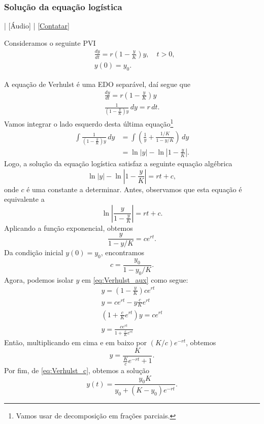 \subsubsection{Solução da equação logística}

\begin{flushright}
  [Vídeo] | [Áudio] | \href{https://phkonzen.github.io/notas/contato.html}{[Contatar]}
\end{flushright}

Consideramos o seguinte PVI
\begin{align}
  &\frac{dy}{dt} = r\left(1 - \frac{y}{K}\right)y,\quad t>0,\\
  &y(0) = y_0.
\end{align}

A equação de Verhulst é uma EDO separável, daí segue que
\begin{gather}
  \frac{dy}{dt} = r\left(1 - \frac{y}{K}\right)y \\
  \frac{1}{\left(1 - \frac{y}{K}\right)y}\,dy = r\,dt.
\end{gather}
Vamos integrar o lado esquerdo desta última equação\footnote{Vamos usar de decomposição em frações parciais.}
\begin{align}
  \int \frac{1}{\left(1 - \frac{y}{K}\right)y}\,dy &= \int \left(\frac{1}{y} + \frac{1/K}{1-y/K}\right)\,dy \\
  &= \ln|y| - \ln\left|1 - \frac{y}{K}\right|.
\end{align}
Logo, a solução da equação logística satisfaz a seguinte equação algébrica
\begin{equation}
  \ln|y| - \ln\left|1 - \frac{y}{K}\right| = rt + c,
\end{equation}
onde $c$ é uma constante a determinar. Antes, observamos que esta equação é equivalente a
\begin{equation}
  \ln\left|\frac{y}{1 - \frac{y}{K}}\right| = rt + c.
\end{equation}
Aplicando a função exponencial, obtemos
\begin{equation}\label{eq:Verhulst_aux}
  \frac{y}{1 - y/K} = ce^{rt}.
\end{equation}
Da condição inicial $y(0) = y_0$, encontramos
\begin{equation}\label{eq:Verhulst_c}
  c = \frac{y_0}{1 - y_0/K}.
\end{equation}
Agora, podemos isolar $y$ em \eqref{eq:Verhulst_aux} como segue: 
\begin{gather}
  y = \left(1-\frac{y}{K}\right)ce^{rt}\\
  y = ce^{rt} - y\frac{c}{K}e^{rt} \\
  \left(1 + \frac{c}{K}e^{rt}\right)y = ce^{rt}\\
  y = \frac{ce^{rt}}{1+\frac{c}{K}e^{rt}}
\end{gather}
Então, multiplicando em cima e em baixo por $(K/c)e^{-rt}$, obtemos
\begin{equation}
  y = \frac{K}{\frac{K}{c}e^{-rt} + 1}.
\end{equation}
Por fim, de \eqref{eq:Verhulst_c}, obtemos a solução
\begin{equation}\label{eq:sol_verhulst}
  y(t) = \frac{y_0K}{y_0 + (K-y_0)e^{-rt}}.
\end{equation}

